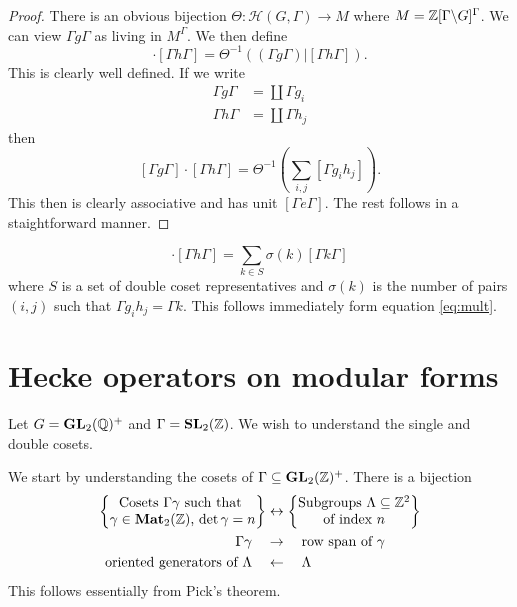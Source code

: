 \documentclass{memoir}
\begin{document}
\begin{proof}
    There is an obvious bijection $\Theta:\mathcal H(G,\Gamma) \to M$ where $M = \mathbb{Z}[\Gamma\backslash G]^\Gamma$.
    We can view $\Gamma g \Gamma$ as living in $M^\Gamma$.
    We then define 
    \begin{equation}
        [\Gamma g \Gamma] \cdot [\Gamma h \Gamma] = \Theta^{-1}((\Gamma g \Gamma) | [\Gamma h \Gamma]).
    \end{equation}
    This is clearly well defined.
    If we write 
    \begin{align}
        \Gamma g \Gamma &= \coprod\Gamma g_i \\
        \Gamma h \Gamma &= \coprod\Gamma h_j
    \end{align}
    then
    \begin{equation}
        \label{eq:mult}
        [\Gamma g \Gamma] \cdot [\Gamma h \Gamma] = \Theta^{-1}\left(\sum_{i,j}[\Gamma g_i h_j]\right).
    \end{equation}
    This then is clearly associative and has unit $[\Gamma e \Gamma]$.
    The rest follows in a staightforward manner.
\end{proof}
\begin{remark}
    \begin{equation}
        [\Gamma g \Gamma] \cdot [\Gamma h \Gamma] = \sum_{k\in S}\sigma(k)[\Gamma k \Gamma]
    \end{equation}
    where $S$ is a set of double coset representatives and $\sigma(k)$ is the number of pairs $(i,j)$ such that $\Gamma g_ih_j = \Gamma k$.
    This follows immediately form equation \ref{eq:mult}.
\end{remark}
\section{Hecke operators on modular forms}
Let $G = \mathbf{GL}_2(\mathbb{Q})^+$ and $\Gamma = \mathbf{SL}_2(\mathbb{Z})$.
We wish to understand the single and double cosets.

We start by understanding the cosets of $\Gamma\subseteq\mathbf{GL}_2(\mathbb{Z})^+$.
There is a bijection 
\begin{align}
\left\{ \begin{matrix} \text{Cosets $\Gamma \gamma$ such that } \\ \text{$\gamma\in \mathbf{Mat}_2(\mathbb{Z})$, $\det\gamma = n$}\end{matrix} \right\} &\leftrightarrow \left\{ \begin{matrix} \text{Subgroups $\Lambda\subseteq\mathbb{Z}^2$} \\ \text{of index $n$}\end{matrix} \right\} \\
    \Gamma\gamma \quad &\rightarrow \quad \text{row span of $\gamma$} \nonumber \\
    \text{oriented generators of } \Lambda \quad &\leftarrow \quad \Lambda \nonumber
\end{align}
This follows essentially from Pick's theorem.
\end{document}
